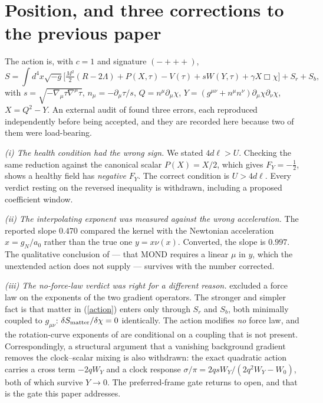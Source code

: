 \documentclass[11pt,letterpaper]{article}
\begin{document}
\section{Position, and three corrections to the previous paper}
The action \cite{paper13} is, with $c=1$ and signature $(-{+}{+}{+})$,
\begin{equation}
S=\int d^4x\sqrt{-g}\Big[\tfrac{M^2}{2}(R-2\Lambda)+P(X,\tau)-V(\tau)+sW(Y,\tau)+\gamma X\Box\chi\Big]+S_r+S_b,
\label{action}
\end{equation}
with $s=\sqrt{-\nabla_\mu\tau\nabla^\mu\tau}$, $n_\mu=-\partial_\mu\tau/s$, $Q=n^\mu\partial_\mu\chi$, $Y=(g^{\mu\nu}+n^\mu n^\nu)\partial_\mu\chi\partial_\nu\chi$, $X=Q^2-Y$. An external audit of \cite{paper23} found three errors, each reproduced independently before being accepted, and they are recorded here because two of them were load-bearing.

\emph{(i) The health condition had the wrong sign.} We stated $4d\ell>U$. Checking the same reduction against the canonical scalar $P(X)=X/2$, which gives $F_Y=-\tfrac12$, shows a healthy field has \emph{negative} $F_Y$. The correct condition is $\boxed{U>4d\ell}$. Every verdict resting on the reversed inequality is withdrawn, including a proposed coefficient window.

\emph{(ii) The interpolating exponent was measured against the wrong acceleration.} The reported slope $0.470$ compared the kernel with the Newtonian acceleration $x=g_N/a_0$ rather than the true one $y=x\nu(x)$. Converted, the slope is $0.997$. The qualitative conclusion of \cite{paper23} --- that MOND requires a linear $\mu$ in $y$, which the unextended action does not supply --- survives with the number corrected.

\emph{(iii) The no-force-law verdict was right for a different reason.} \cite{paper23} excluded a force law on the exponents of the two gradient operators. The stronger and simpler fact is that matter in (\ref{action}) enters only through $S_r$ and $S_b$, both minimally coupled to $g_{\mu\nu}$: $\delta S_{\rm matter}/\delta\chi=0$ identically. The action modifies \emph{no} force law, and the rotation-curve exponents of \cite{paper23} are conditional on a coupling that is not present. Correspondingly, a structural argument that a vanishing background gradient removes the clock--scalar mixing is also withdrawn: the exact quadratic action carries a cross term $-2qW_Y$ and a clock response $\sigma/\pi=2qsW_Y/(2q^2W_Y-W_0)$, both of which survive $Y\to0$. The preferred-frame gate returns to open, and that is the gate this paper addresses.
\end{document}
